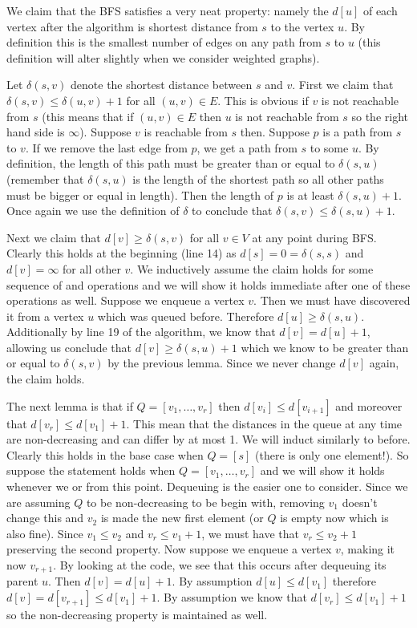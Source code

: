 We claim that the BFS satisfies a very neat property: namely the $d[u]$ of each vertex after the algorithm is shortest distance from $s$ to the vertex $u$. By definition this is the smallest number of edges on any path from $s$ to $u$ (this definition will alter slightly when we consider weighted graphs). 

Let $\delta(s, v)$ denote the shortest distance between $s$ and $v$. First we claim that $\delta(s, v) \leq \delta(u, v) + 1$ for all $(u, v) \in E$. This is obvious if $v$ is not reachable from $s$ (this means that if $(u, v) \in E$ then $u$ is not reachable from $s$ so the right hand side is $\infty$). Suppose $v$ is reachable from $s$ then. Suppose $p$ is a path from $s$ to $v$. If we remove the last edge from $p$, we get a path from $s$ to some $u$. By definition, the length of this path must be greater than or equal to $\delta(s, u)$ (remember that $\delta(s, u)$ is the length of the shortest path so all other paths must be bigger or equal in length). Then the length of $p$ is at least $\delta(s, u) + 1$. Once again we use the definition of $\delta$ to conclude that $\delta(s, v) \leq \delta(s, u) + 1$.

Next we claim that $d[v] \geq \delta(s, v)$ for all $v \in V$ at any point during BFS. Clearly this holds at the beginning (line 14) as $d[s] = 0 = \delta(s, s)$ and $d[v] = \infty$ for all other $v$. We inductively assume the claim holds for some sequence of  and  operations and we will show it holds immediate after one of these operations as well. Suppose we enqueue a vertex $v$. Then we must have discovered it from a vertex $u$ which was queued before. Therefore $d[u] \geq \delta(s, u)$. Additionally by line 19 of the algorithm, we know that $d[v] = d[u] + 1$, allowing us conclude that $d[v] \geq \delta(s, u) + 1$ which we know to be greater than or equal to $\delta(s, v)$ by the previous lemma. Since we never change $d[v]$ again, the claim holds.

The next lemma is that if $Q = [v_1, \dots, v_r]$ then $d[v_i] \leq d[v_{i + 1}]$ and moreover that $d[v_r] \leq d[v_1] + 1$. This mean that the distances in the queue at any time are non-decreasing and can differ by at most 1. We will induct similarly to before. Clearly this holds in the base case when $Q = [s]$ (there is only one element!). So suppose the statement holds when $Q = [v_1, \dots, v_r]$ and we will show it holds whenever we  or  from this point. Dequeuing is the easier one to consider. Since we are assuming $Q$ to be non-decreasing to be begin with, removing $v_1$ doesn't change this and $v_2$ is made the new first element (or $Q$ is empty now which is also fine). Since $v_1 \leq v_2$ and $v_r \leq v_1 + 1$, we must have that $v_r \leq v_2 + 1$ preserving the second property. Now suppose we enqueue a vertex $v$, making it now $v_{r+1}$. By looking at the code, we see that this occurs after dequeuing its parent $u$. Then $d[v] = d[u] + 1$. By assumption $d[u] \leq d[v_1]$ therefore $d[v] = d[v_{r + 1}] \leq d[v_1] + 1$. By assumption we know that $d[v_r] \leq d[v_1] + 1$ so the non-decreasing property is maintained as well.

